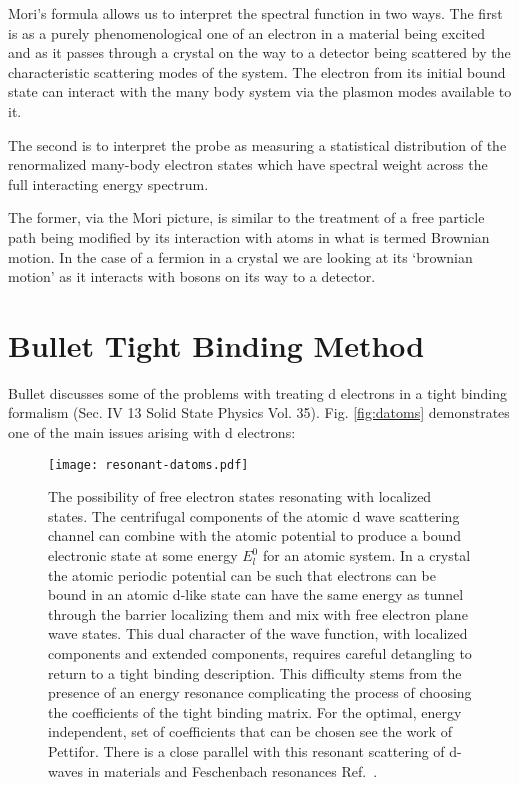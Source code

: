 \documentclass{article}
\begin{document}
Mori's formula allows us to interpret the spectral function in two ways. The first is as
a purely phenomenological one of an electron in a material being excited and as it passes through
a crystal on the way to a detector being scattered by the characteristic scattering modes of the
system. The electron from its initial bound state can interact with the many body system via
the plasmon modes available to it.

The second is to interpret the probe as measuring a statistical distribution of the 
renormalized many-body electron states which have spectral weight across the full
interacting energy spectrum. 

The former, via the Mori picture, is similar to the treatment of a free particle path
being modified by its interaction with atoms in what is termed Brownian motion. In the
case of a fermion in a crystal we are looking at its `brownian motion' as it interacts
with bosons on its way to a detector.

\section{Bullet Tight Binding Method}
\label{sec:bullet}
Bullet discusses some of the problems with treating d electrons in a tight binding 
formalism (Sec. IV 13 Solid State Physics Vol. 35). Fig. \ref{fig:datoms} demonstrates
one of the main issues arising with d electrons:
%
\begin{figure}
\texttt{[image: resonant-datoms.pdf]}
\caption{The possibility of free electron states resonating with localized states.
The centrifugal components of the atomic d wave scattering channel can combine with
the atomic potential to produce a bound electronic state at some energy $E^{0}_{l}$ for an atomic system.
In a crystal the atomic periodic potential can be such that electrons can be bound in an
atomic d-like state can have the same energy as tunnel through the barrier localizing them and mix with free electron 
plane wave states. This dual character of the wave function, with localized components and extended components, requires careful 
detangling to return to a tight binding description. This difficulty stems from the presence of an energy resonance 
complicating the process of choosing the coefficients of the tight binding matrix. For the optimal, energy independent,
set of coefficients that can be chosen see the work of Pettifor. There is a close parallel with this resonant scattering of d-waves in materials
and Feschenbach resonances Ref.~\cite{chin10}.}
\end{figure}
%
\end{document}
